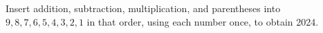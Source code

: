 Insert addition, subtraction, multiplication, and parentheses into $9,8,7,6,5,4,3,2,1$ in that order, using each number once, to obtain 2024.
